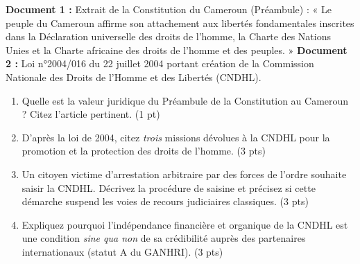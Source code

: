 \documentclass[11pt]{article}
\begin{document}
\begin{exercice}
\label{exo:national}
\textbf{Document 1 :} Extrait de la Constitution du Cameroun (Préambule) : « Le peuple du Cameroun affirme son attachement aux libertés fondamentales inscrites dans la Déclaration universelle des droits de l'homme, la Charte des Nations Unies et la Charte africaine des droits de l'homme et des peuples. »
\textbf{Document 2 :} Loi n°2004/016 du 22 juillet 2004 portant création de la Commission Nationale des Droits de l'Homme et des Libertés (CNDHL).
\begin{enumerate}
    \item Quelle est la valeur juridique du Préambule de la Constitution au Cameroun ? Citez l'article pertinent. \hfill (1 pt)
    \item D'après la loi de 2004, citez \emph{trois} missions dévolues à la CNDHL pour la promotion et la protection des droits de l'homme. \hfill (3 pts)
    \item Un citoyen victime d'arrestation arbitraire par des forces de l'ordre souhaite saisir la CNDHL. Décrivez la procédure de saisine et précisez si cette démarche suspend les voies de recours judiciaires classiques. \hfill (3 pts)
    \item Expliquez pourquoi l'indépendance financière et organique de la CNDHL est une condition \emph{sine qua non} de sa crédibilité auprès des partenaires internationaux (statut A du GANHRI). \hfill (3 pts)
\end{enumerate}
\end{exercice}
\end{document}
